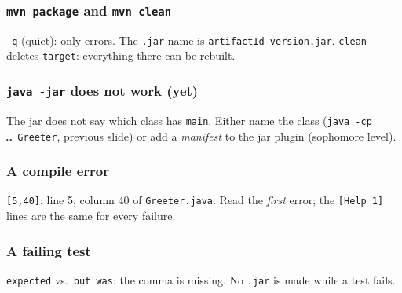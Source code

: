\documentclass[aspectratio=169,10pt,compress]{beamer}
\begin{document}
\begin{frame}[t,fragile] \frametitle{\texttt{mvn package} and \texttt{mvn clean}}

  \vspace{0.1em}
  \small
  \texttt{-q} (quiet): only errors. The \texttt{.jar} name is \texttt{artifactId-version.jar}. \texttt{clean} deletes \texttt{target}: everything there can be rebuilt.
\end{frame}




\begin{frame}[t,fragile] \frametitle{\texttt{java -jar} does not work (yet)}

  \vspace{0.1em}
  \small
  The jar does not say which class has \texttt{main}. Either name the class (\texttt{java -cp \dots\ Greeter}, previous slide) or add a \emph{manifest} to the jar plugin (sophomore level).
\end{frame}





\begin{frame}[t,fragile] \frametitle{A compile error}

  \vspace{0.1em}
  \small
  \texttt{[5,40]}: line 5, column 40 of \texttt{Greeter.java}. Read the \emph{first} error; the \texttt{[Help 1]} lines are the same for every failure.
\end{frame}




\begin{frame}[t,fragile] \frametitle{A failing test}

  \vspace{0.1em}
  \small
  \texttt{expected} vs.\ \texttt{but was}: the comma is missing. No \texttt{.jar} is made while a test fails.
\end{frame}
\end{document}
